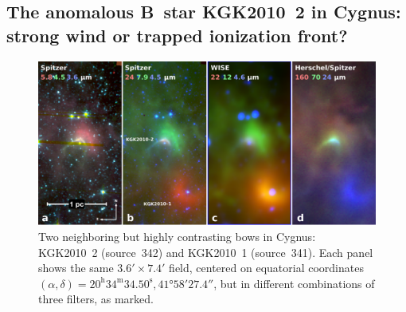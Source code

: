 \subsection{The anomalous B~star KGK2010~2 in Cygnus: strong wind or
  trapped ionization front?}
\label{sec:anomalous-b-star}

\begin{figure}
  \centering
  \includegraphics[width=\linewidth]{figs/cygnus-bows-midir-combo}
  \caption{Two neighboring but highly contrasting bows in Cygnus:
    KGK2010~2 (source~342) and KGK2010~1 (source~341). Each panel
    shows the same \(3.6' \times 7.4'\) field, centered on equatorial
    coordinates
    \((\alpha, \delta) = 20^{\text{h}}34^{\text{m}}34.50^{\text{s}},
    \ang{+41;58;27.4}\), but in different combinations of three
    filters, as marked. }
  \label{fig:cygnus-bows}
\end{figure}


